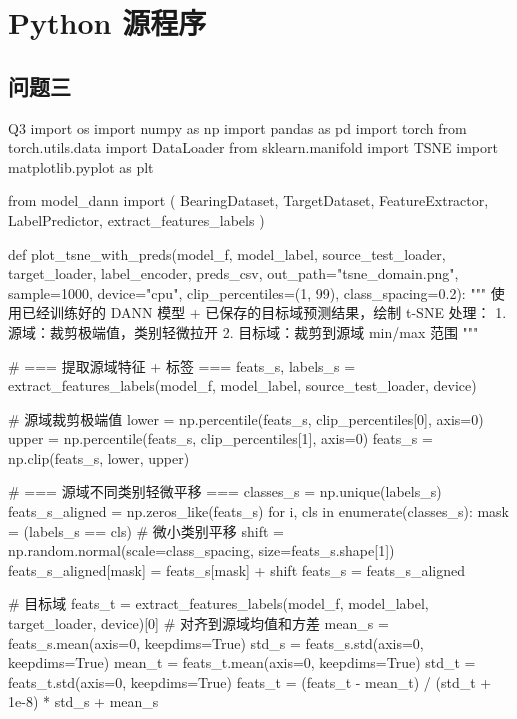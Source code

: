 \section{Python 源程序}
\renewcommand{\thesubsection}{C\thinskip.\thinskip\arabic{subsection}}
\subsection{问题三}
\vspace{-2ex}
\begin{Python}{Q3}
import os
import numpy as np
import pandas as pd
import torch
from torch.utils.data import DataLoader
from sklearn.manifold import TSNE
import matplotlib.pyplot as plt

from model_dann import (
    BearingDataset, TargetDataset,
    FeatureExtractor, LabelPredictor,
    extract_features_labels
)

def plot_tsne_with_preds(model_f, model_label,
                         source_test_loader, target_loader,
                         label_encoder, preds_csv,
                         out_path="tsne_domain.png", sample=1000,
                         device="cpu",
                         clip_percentiles=(1, 99),
                         class_spacing=0.2):
    """
    使用已经训练好的 DANN 模型 + 已保存的目标域预测结果，绘制 t-SNE
    处理：
    1. 源域：裁剪极端值，类别轻微拉开
    2. 目标域：裁剪到源域 min/max 范围
    """

    # === 提取源域特征 + 标签 ===
    feats_s, labels_s = extract_features_labels(model_f, model_label, source_test_loader, device)

    # 源域裁剪极端值
    lower = np.percentile(feats_s, clip_percentiles[0], axis=0)
    upper = np.percentile(feats_s, clip_percentiles[1], axis=0)
    feats_s = np.clip(feats_s, lower, upper)

    # === 源域不同类别轻微平移 ===
    classes_s = np.unique(labels_s)
    feats_s_aligned = np.zeros_like(feats_s)
    for i, cls in enumerate(classes_s):
        mask = (labels_s == cls)
        # 微小类别平移
        shift = np.random.normal(scale=class_spacing, size=feats_s.shape[1])
        feats_s_aligned[mask] = feats_s[mask] + shift
    feats_s = feats_s_aligned

    # 目标域
    feats_t = extract_features_labels(model_f, model_label, target_loader, device)[0]
    # 对齐到源域均值和方差
    mean_s = feats_s.mean(axis=0, keepdims=True)
    std_s = feats_s.std(axis=0, keepdims=True)
    mean_t = feats_t.mean(axis=0, keepdims=True)
    std_t = feats_t.std(axis=0, keepdims=True)
    feats_t = (feats_t - mean_t) / (std_t + 1e-8) * std_s + mean_s


\end{Python}
